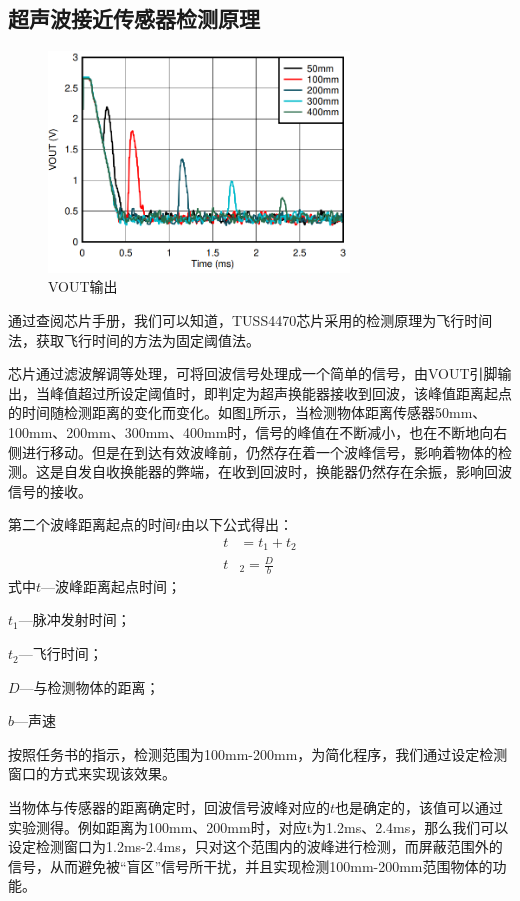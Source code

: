 \subsection{超声波接近传感器检测原理}
\begin{figure}[!h]
	\centering
	\includegraphics[width=8cm]{figure/VOUT image.png}
	\caption{VOUT输出}
	\label{VOUT输出}
\end{figure}\par
通过查阅芯片手册，我们可以知道，TUSS4470芯片采用的检测原理为飞行时间法，获取飞行时间的方法为固定阈值法。\par
芯片通过滤波解调等处理，可将回波信号处理成一个简单的信号，由VOUT引脚输出，当峰值超过所设定阈值时，即判定为超声换能器接收到回波，该峰值距离起点的时间随检测距离的变化而变化。如图\ref{VOUT输出}所示，当检测物体距离传感器50mm、100mm、200mm、300mm、400mm时，信号的峰值在不断减小，也在不断地向右侧进行移动。但是在到达有效波峰前，仍然存在着一个波峰信号，影响着物体的检测。这是自发自收换能器的弊端，在收到回波时，换能器仍然存在余振，影响回波信号的接收。\par
第二个波峰距离起点的时间$t$由以下公式得出：       
\begin{align}
	t&=t_1+t_2 \\
	t&_2=\frac{D}{b}	
	\label{检测周期公式}
\end{align}  
式中\quad$t$---波峰距离起点时间；\par
\quad$t_1$---脉冲发射时间；\par
\quad$t_2$---飞行时间；\par    
\quad$D$---与检测物体的距离；\par  
\quad$b$---声速\par    
按照任务书的指示，检测范围为100mm-200mm，为简化程序，我们通过设定检测窗口的方式来实现该效果。\par  
当物体与传感器的距离确定时，回波信号波峰对应的$t$也是确定的，该值可以通过实验测得。例如距离为100mm、200mm时，对应t为1.2ms、2.4ms，那么我们可以设定检测窗口为1.2ms-2.4ms，只对这个范围内的波峰进行检测，而屏蔽范围外的信号，从而避免被“盲区”信号所干扰，并且实现检测100mm-200mm范围物体的功能。\par
